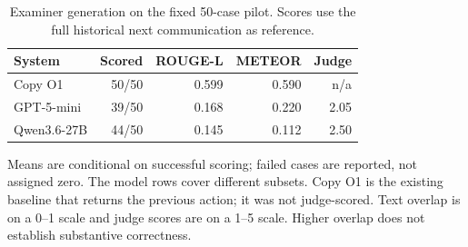 \begin{table}[t]
\centering
\small
\setlength{\tabcolsep}{6pt}
\renewcommand{\arraystretch}{1.14}
\begin{tabular}{lrrrr}
\toprule
System & Scored & ROUGE-L & METEOR & Judge \\
\midrule
Copy O1 & 50/50 & 0.599 & 0.590 & n/a \\
GPT-5-mini & 39/50 & 0.168 & 0.220 & 2.05 \\
Qwen3.6-27B & 44/50 & 0.145 & 0.112 & 2.50 \\
\bottomrule
\end{tabular}
\caption{Examiner generation on the fixed 50-case pilot. Scores use the full historical next communication as reference.}
\label{tab:cgen-t01}
\vspace{2pt}
\begin{minipage}{\textwidth}
\footnotesize Means are conditional on successful scoring; failed cases are reported, not assigned zero. The model rows cover different subsets. Copy O1 is the existing baseline that returns the previous action; it was not judge-scored. Text overlap is on a 0--1 scale and judge scores are on a 1--5 scale. Higher overlap does not establish substantive correctness.
\end{minipage}
\end{table}
